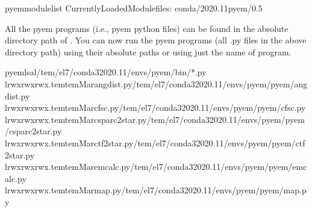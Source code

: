 \documentclass[a4paper,11pt,english]{sphinxmanual}
\begin{document}
\begin{sphinxVerbatim}[commandchars=\\\{\}]
pyem\PYGZdl{}\PYGZgt{}modulelist
CurrentlyLoadedModulefiles:
conda/2020.11pyem/0.5
\end{sphinxVerbatim}

\sphinxAtStartPar
All the pyem programs (i.e., pyem python files) can be found in the absolute directory path of .
You can now run the pyem programs (all .py files in the above directory path) using their absolute paths or using just the name of program.

\begin{sphinxVerbatim}[commandchars=\\\{\}]
pyem\PYGZdl{}\PYGZgt{}ls\PYGZhy{}al/tem/el7/conda3\PYGZhy{}2020.11/envs/pyem/bin/*.py
lrwxrwxrwx.temtemMarangdist.py\PYGZhy{}\PYGZgt{}/tem/el7/conda3\PYGZhy{}2020.11/envs/pyem/pyem/angdist.py
lrwxrwxrwx.temtemMarcfsc.py\PYGZhy{}\PYGZgt{}/tem/el7/conda3\PYGZhy{}2020.11/envs/pyem/pyem/cfsc.py
lrwxrwxrwx.temtemMarcsparc2star.py\PYGZhy{}\PYGZgt{}/tem/el7/conda3\PYGZhy{}2020.11/envs/pyem/pyem/csparc2star.py
lrwxrwxrwx.temtemMarctf2star.py\PYGZhy{}\PYGZgt{}/tem/el7/conda3\PYGZhy{}2020.11/envs/pyem/pyem/ctf2star.py
lrwxrwxrwx.temtemMaremcalc.py\PYGZhy{}\PYGZgt{}/tem/el7/conda3\PYGZhy{}2020.11/envs/pyem/pyem/emcalc.py
lrwxrwxrwx.temtemMarmap.py\PYGZhy{}\PYGZgt{}/tem/el7/conda3\PYGZhy{}2020.11/envs/pyem/pyem/map.py

\end{sphinxVerbatim}
\end{document}
